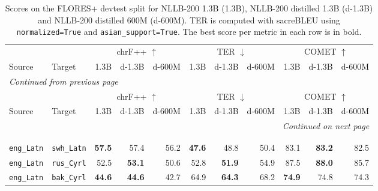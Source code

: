 \begingroup
\footnotesize
\setlength{\tabcolsep}{3pt}
\setlength{\LTleft}{0pt plus 1fill minus 1fill}
\setlength{\LTright}{0pt plus 1fill minus 1fill}
\setlength{\LTcapwidth}{\textwidth}
\renewcommand{\tablename}{\normalsize Table}
\begin{longtable}{@{}ll rrr rrr rrr@{}}
\toprule
 & & \multicolumn{3}{c}{chrF++ $\uparrow$} & \multicolumn{3}{c}{TER $\downarrow$} & \multicolumn{3}{c}{COMET $\uparrow$} \\
\cmidrule(lr){3-5} \cmidrule(lr){6-8} \cmidrule(lr){9-11}
Source & Target & 1.3B & d-1.3B & d-600M & 1.3B & d-1.3B & d-600M & 1.3B & d-1.3B & d-600M \\
\midrule
\endfirsthead
\multicolumn{11}{l}{\textit{Continued from previous page}} \\
\toprule
 & & \multicolumn{3}{c}{chrF++ $\uparrow$} & \multicolumn{3}{c}{TER $\downarrow$} & \multicolumn{3}{c}{COMET $\uparrow$} \\
\cmidrule(lr){3-5} \cmidrule(lr){6-8} \cmidrule(lr){9-11}
Source & Target & 1.3B & d-1.3B & d-600M & 1.3B & d-1.3B & d-600M & 1.3B & d-1.3B & d-600M \\
\midrule
\endhead
\midrule
\multicolumn{11}{r}{\textit{Continued on next page}} \\
\endfoot
\bottomrule
\addlinespace[\abovecaptionskip]
\caption{Scores on the FLORES+ devtest split for NLLB-200 1.3B (1.3B), NLLB-200 distilled 1.3B (d-1.3B) and NLLB-200 distilled 600M (d-600M). TER is computed with sacreBLEU using \texttt{normalized=True} and \texttt{asian\_support=True}. The best score per metric in each row is in bold.}
\label{tab:devtest-scores} \\
\endlastfoot
\multicolumn{11}{l}{\textit{The eight original languages}} \\
\texttt{eng\_Latn} & \texttt{swh\_Latn} & \textbf{57.5} & 57.4 & 56.2 & \textbf{47.6} & 48.8 & 50.4 & 83.1 & \textbf{83.2} & 82.5 \\
\texttt{eng\_Latn} & \texttt{rus\_Cyrl} & 52.5 & \textbf{53.1} & 50.6 & 52.8 & \textbf{51.9} & 54.9 & 87.5 & \textbf{88.0} & 85.7 \\
\texttt{eng\_Latn} & \texttt{bak\_Cyrl} & \textbf{44.6} & \textbf{44.6} & 42.7 & 64.9 & \textbf{64.3} & 68.2 & \textbf{74.9} & 74.8 & 74.3 \\

\end{longtable}
